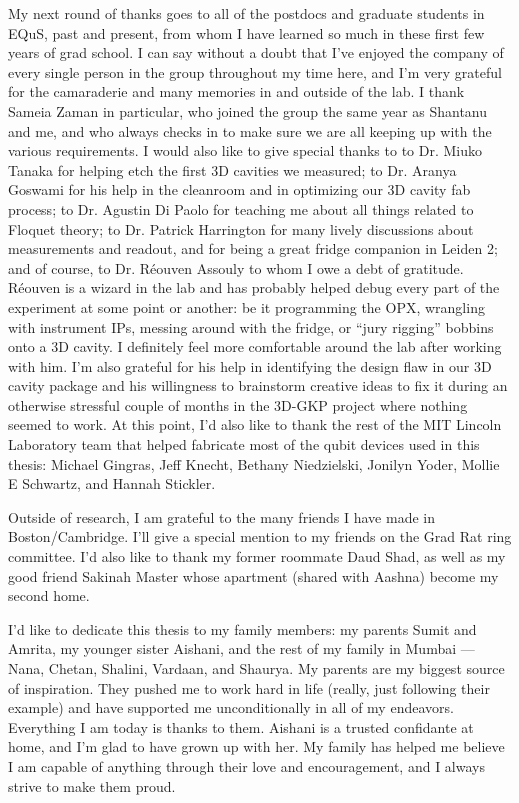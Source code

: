 \begin{onehalfspacing}
My next round of thanks goes to all of the postdocs and graduate students in EQuS, past and present, from whom I have learned so much in these first few years of grad school. I can say without a doubt that I've enjoyed the company of every single person in the group throughout my time here, and I'm very grateful for the camaraderie and many memories in and outside of the lab. I thank Sameia Zaman in particular, who joined the group the same year as Shantanu and me, and who always checks in to make sure we are all keeping up with the various requirements. I would also like to give special thanks to to Dr. Miuko Tanaka for helping etch the first 3D cavities we measured; to Dr. Aranya Goswami for his help in the cleanroom and in optimizing our 3D cavity fab process; to Dr. Agustin Di Paolo for teaching me about all things related to Floquet theory; to Dr. Patrick Harrington for many lively discussions about measurements and readout, and for being a great fridge companion in Leiden 2; and of course, to Dr. R\'eouven Assouly to whom I owe a debt of gratitude. R\'eouven is a wizard in the lab and has probably helped debug every part of the experiment at some point or another: be it programming the OPX, wrangling with instrument IPs, messing around with the fridge, or ``jury rigging'' bobbins onto a 3D cavity. I definitely feel more comfortable around the lab after working with him. I'm also grateful for his help in identifying the design flaw in our 3D cavity package and his willingness to brainstorm creative ideas to fix it during an otherwise stressful couple of months in the 3D-GKP project where nothing seemed to work. At this point, I'd also like to thank the rest of the MIT Lincoln Laboratory team that helped fabricate most of the qubit devices used in this thesis: Michael Gingras, Jeff Knecht, Bethany Niedzielski, Jonilyn Yoder, Mollie E Schwartz, and Hannah Stickler.

Outside of research, I am grateful to the many friends I have made in Boston/Cambridge. I'll give a special mention to my friends on the Grad Rat ring committee. I'd also like to thank my former roommate Daud Shad, as well as my good friend Sakinah Master whose apartment (shared with Aashna) become my second home. 

I'd like to dedicate this thesis to my family members: my parents Sumit and Amrita, my younger sister Aishani, and the rest of my family in Mumbai --- Nana, Chetan, Shalini, Vardaan, and Shaurya. My parents are my biggest source of inspiration. They pushed me to work hard in life (really, just following their example) and have supported me unconditionally in all of my endeavors. Everything I am today is thanks to them. Aishani is a trusted confidante at home, and I'm glad to have grown up with her. My family has helped me believe I am capable of anything through their love and encouragement, and I always strive to make them proud.


\end{onehalfspacing}
